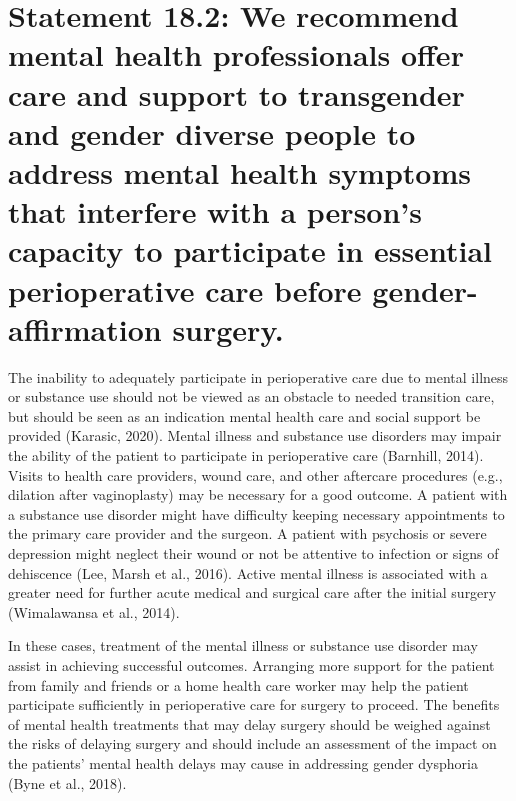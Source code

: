 \documentclass[
]{book}
\begin{document}
\hypertarget{statement-18.2-we-recommend-mental-health-professionals-offer-care-and-support-to-transgender-and-gender-diverse-people-to-address-mental-health-symptoms-that-interfere-with-a-persons-capacity-to-participate-in-essential-perioperative-care-before-gender-affirmation-surgery.}{%
\section*{Statement 18.2: We recommend mental health professionals offer care and support to transgender and gender diverse people to address mental health symptoms that interfere with a person's capacity to participate in essential perioperative care before gender-affirmation surgery.}\label{statement-18.2-we-recommend-mental-health-professionals-offer-care-and-support-to-transgender-and-gender-diverse-people-to-address-mental-health-symptoms-that-interfere-with-a-persons-capacity-to-participate-in-essential-perioperative-care-before-gender-affirmation-surgery.}}

The inability to adequately participate in
perioperative care due to mental illness or substance use should not be viewed as an obstacle
to needed transition care, but should be seen as
an indication mental health care and social support be provided (Karasic, 2020). Mental illness
and substance use disorders may impair the ability of the patient to participate in perioperative
care (Barnhill, 2014). Visits to health care providers, wound care, and other aftercare procedures (e.g., dilation after vaginoplasty) may be
necessary for a good outcome. A patient with a
substance use disorder might have difficulty
keeping necessary appointments to the primary
care provider and the surgeon. A patient with
psychosis or severe depression might neglect
their wound or not be attentive to infection or
signs of dehiscence (Lee, Marsh et al., 2016).
Active mental illness is associated with a greater
need for further acute medical and surgical care
after the initial surgery (Wimalawansa
et al., 2014).

In these cases, treatment of the mental illness
or substance use disorder may assist in achieving
successful outcomes. Arranging more support for
the patient from family and friends or a home
health care worker may help the patient participate sufficiently in perioperative care for surgery
to proceed. The benefits of mental health treatments that may delay surgery should be weighed
against the risks of delaying surgery and should
include an assessment of the impact on the
patients' mental health delays may cause in
addressing gender dysphoria (Byne et al., 2018).
\end{document}
